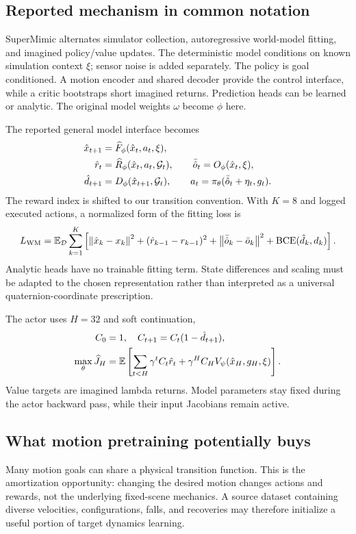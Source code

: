 \subsection{Reported mechanism in common notation}
SuperMimic alternates simulator collection, autoregressive world-model fitting,
and imagined policy/value updates. The deterministic model conditions on known
simulation context $\xi$; sensor noise is added separately. The policy is goal
conditioned. A motion encoder and shared decoder provide the control interface,
while a critic bootstraps short imagined returns. Prediction heads can be
learned or analytic. The original model weights $\omega$ become $\phi$ here.

The reported general model interface becomes
\begin{align}
\hat x_{t+1}&=\widehat F_\phi(\hat x_t,a_t,\xi),\\
\hat r_t&=\widehat R_\phi(\hat x_t,a_t,\mathcal G_t),\qquad
\bar{\hat o}_t=O_\phi(\hat x_t,\xi),\\
\hat d_{t+1}&=D_\phi(\hat x_{t+1},\mathcal G_t),\qquad
a_t=\pi_\theta(\bar{\hat o}_t+\eta_t,g_t).
\end{align}
The reward index is shifted to our transition convention. With $K=8$ and logged
executed actions, a normalized form of the fitting loss is
\begin{equation}
L_{\rm WM}=\mathbb E_{\mathcal D}\sum_{k=1}^{K}\left[
\left\lVert\hat x_k-x_k\right\rVert^2+(\hat r_{k-1}-r_{k-1})^2
+\left\lVert\bar{\hat o}_k-\bar o_k\right\rVert^2+\operatorname{BCE}(\hat d_k,d_k)\right].
\end{equation}
Analytic heads have no trainable fitting term. State differences and scaling
must be adapted to the chosen representation rather than interpreted as a
universal quaternion-coordinate prescription.

The actor uses $H=32$ and soft continuation,
\begin{align}
C_0&=1,\quad C_{t+1}=C_t(1-\hat d_{t+1}),\\
\max_\theta\widehat J_H&=\mathbb E\left[\sum_{t<H}\gamma^tC_t\hat r_t
+\gamma^HC_HV_\psi(\hat x_H,g_H,\xi)\right].
\end{align}
Value targets are imagined lambda returns. Model parameters stay fixed during
the actor backward pass, while their input Jacobians remain active.

\subsection{What motion pretraining potentially buys}
Many motion goals can share a physical transition function. This is the
amortization opportunity: changing the desired motion changes actions and rewards,
not the underlying fixed-scene mechanics. A source dataset containing diverse
velocities, configurations, falls, and recoveries may therefore initialize a
useful portion of target dynamics learning.

